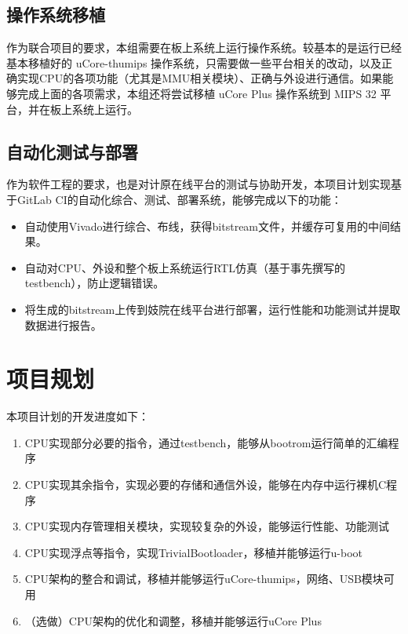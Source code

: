 \subsection{操作系统移植}

作为联合项目的要求，本组需要在板上系统上运行操作系统。较基本的是运行已经基本移植好的 uCore-thumips 操作系统，只需要做一些平台相关的改动，以及正确实现CPU的各项功能（尤其是MMU相关模块）、正确与外设进行通信。如果能够完成上面的各项需求，本组还将尝试移植 uCore Plus 操作系统到 MIPS 32 平台，并在板上系统上运行。

\subsection{自动化测试与部署}

作为软件工程的要求，也是对计原在线平台的测试与协助开发，本项目计划实现基于GitLab CI的自动化综合、测试、部署系统，能够完成以下的功能：

\begin{itemize}

    \item 自动使用Vivado进行综合、布线，获得bitstream文件，并缓存可复用的中间结果。
    \item 自动对CPU、外设和整个板上系统运行RTL仿真（基于事先撰写的testbench），防止逻辑错误。
    \item 将生成的bitstream上传到妓院在线平台进行部署，运行性能和功能测试并提取数据进行报告。

\end{itemize}

\section{项目规划}

本项目计划的开发进度如下：

\begin{enumerate}

    \item CPU实现部分必要的指令，通过testbench，能够从bootrom运行简单的汇编程序
    \item CPU实现其余指令，实现必要的存储和通信外设，能够在内存中运行裸机C程序
    \item CPU实现内存管理相关模块，实现较复杂的外设，能够运行性能、功能测试
    \item CPU实现浮点等指令，实现TrivialBootloader，移植并能够运行u-boot
    \item CPU架构的整合和调试，移植并能够运行uCore-thumips，网络、USB模块可用
    \item （选做）CPU架构的优化和调整，移植并能够运行uCore Plus

\end{enumerate}

